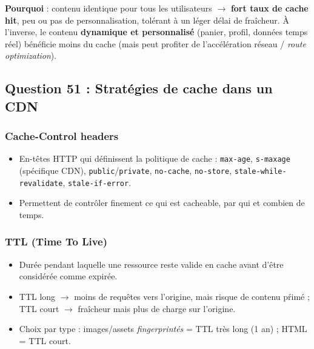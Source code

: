 \documentclass[12pt,a4paper]{article}
\begin{document}
\medskip
\textbf{Pourquoi} : contenu identique pour tous les utilisateurs $\rightarrow$ \textbf{fort taux de cache hit}, peu ou pas de personnalisation, tol\'erant \`a un l\'eger d\'elai de fra\^icheur. \`A l'inverse, le contenu \textbf{dynamique et personnalis\'e} (panier, profil, donn\'ees temps r\'eel) b\'en\'eficie moins du cache (mais peut profiter de l'acc\'el\'eration r\'eseau / \textit{route optimization}).

\subsection*{Question 51 : Strat\'egies de cache dans un CDN}

\subsubsection*{Cache-Control headers}
\begin{itemize}
  \item En-t\^etes HTTP qui d\'efinissent la politique de cache : \texttt{max-age}, \texttt{s-maxage} (sp\'ecifique CDN), \texttt{public}/\texttt{private}, \texttt{no-cache}, \texttt{no-store}, \texttt{stale-while-revalidate}, \texttt{stale-if-error}.
  \item Permettent de contr\^oler finement ce qui est cacheable, par qui et combien de temps.
\end{itemize}

\subsubsection*{TTL (Time To Live)}
\begin{itemize}
  \item Dur\'ee pendant laquelle une ressource reste valide en cache avant d'\^etre consid\'er\'ee comme expir\'ee.
  \item TTL long $\rightarrow$ moins de requ\^etes vers l'origine, mais risque de contenu p\'rim\'e ; TTL court $\rightarrow$ fra\^icheur mais plus de charge sur l'origine.
  \item Choix par type : images/assets \textit{fingerprint\'es} = TTL tr\`es long (1 an) ; HTML = TTL court.
\end{itemize}
\end{document}
